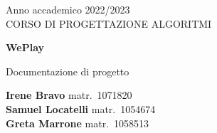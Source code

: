 \begin{titlepage}
    \begin{center}
        \large
        Anno accademico 2022/2023 \\
        CORSO DI PROGETTAZIONE ALGORITMI

        \vfill

        \Huge
        \textbf{WePlay}

        \LARGE
        Documentazione di progetto
    \end{center}

    \vfill

    \begin{flushleft}
        \large
        \textbf{Irene Bravo} matr.~1071820 \\
        \smallskip
        \textbf{Samuel Locatelli} matr.~1054674 \\
        \smallskip
        \textbf{Greta Marrone} matr.~1058513
    \end{flushleft}

\end{titlepage}